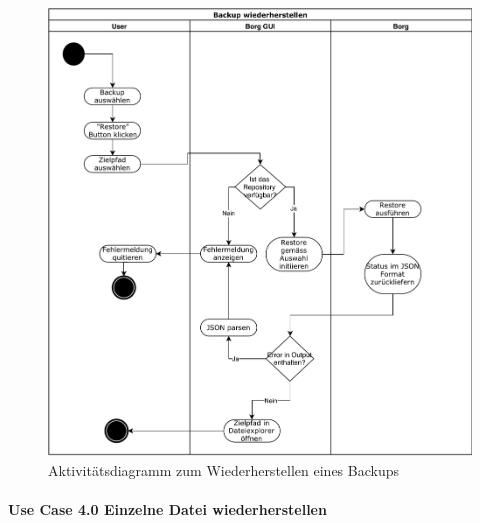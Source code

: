 \begin{figure}[htbp]
\centering
\includegraphics[width=.9\linewidth]{pictures/activity_restore.pdf}
\caption{\label{fig:org613ab2a}
Aktivitätsdiagramm zum Wiederherstellen eines Backups}
\end{figure}
\newpage
\paragraph{Use Case 4.0 Einzelne Datei wiederherstellen}
\label{sec:org2c8981d}

